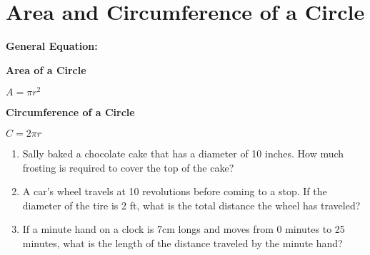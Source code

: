 \section[Circles]{Area and Circumference of a Circle}

\textbf{General Equation:}

\begin{center}
\setlength{\columnseprule}{0pt}
\begin{multicols}{2}
\textbf{Area of a Circle}

\medskip
$A=\pi r^2$

\textbf{Circumference of a Circle}

\medskip
$C=2\pi r$
\end{multicols}
\end{center}

\vfill
\begin{enumerate}[labelindent=*,style=multiline,leftmargin=*,label=\textbf{Example \arabic*:}]
\item Sally baked a chocolate cake that has a diameter of 10 inches. How much frosting is required to cover the top of the cake?

\vfill\item A car's wheel travels at 10 revolutions before coming to a stop. If the diameter of the tire is 2 ft, what is the total distance the wheel has traveled?

\vfill\item If a minute hand on a clock is 7cm longs and moves from 0 minutes to 25 minutes, what is the length of the distance traveled by the minute hand?
\end{enumerate}


